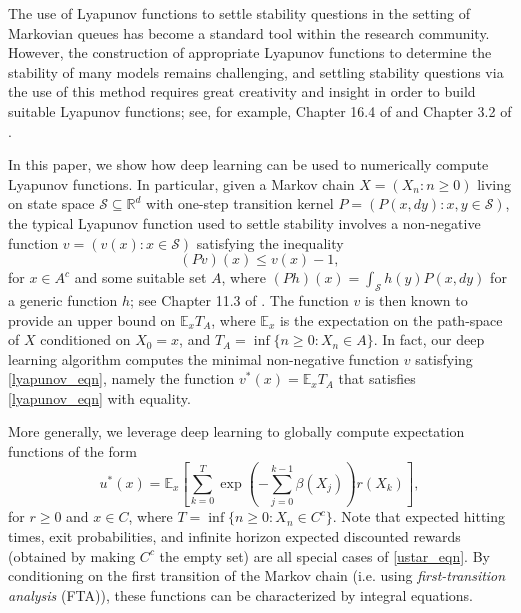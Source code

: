 \documentclass[pdflatex,sn-mathphys-ay]{sn-jnl}%
\numberwithin{equation}{section}
\newcommand\prs[1]{\left(#1\right)}
\newcommand\sbk[1]{\left[#1\right]}
\newcommand{\E}{\mathbb{E}}
\newcommand{\Scal}{\mathcal{S}}
\newcommand{\R}{\mathbb{R}}
\theoremstyle{thmstyleone}%
\theoremstyle{thmstyletwo}%
\theoremstyle{thmstylethree}%
\begin{document}
The use of Lyapunov functions to settle stability questions in the setting of Markovian queues has become a standard tool within the research community. However, the construction of appropriate Lyapunov functions to determine the stability of many models remains challenging, and settling stability questions via the use of this method requires great creativity and insight in order to build suitable Lyapunov functions; see, for example, Chapter 16.4 of \cite{meyn2012markov} and Chapter 3.2 of \cite{dai2020processing}.

In this paper, we show how deep learning can be used to numerically compute Lyapunov functions. In particular, given a Markov chain $X=(X_n:n\geq0)$ living on state space $\Scal\subseteq \R^d$ with one-step transition kernel $P=(P(x,dy):x,y\in\Scal)$, the typical Lyapunov function used to settle stability involves a non-negative function $v=(v(x):x\in\Scal)$ satisfying the inequality
\begin{equation}
\label{lyapunov_eqn}
(Pv)(x)\leq v(x)-1,
\end{equation}
for $x\in A^c$ and some suitable set $A$, where $(Ph)(x)=\int_\Scal h(y)P(x,dy)$ for a generic function $h$; see Chapter 11.3 of \cite{meyn2012markov}. The function $v$ is then known to provide an upper bound on $\E_x T_A$, where $\E_x$ is the expectation on the path-space of $X$ conditioned on $X_0=x$, and $T_A=\inf\{n\geq0:X_n\in A\}$. In fact, our deep learning algorithm computes the minimal non-negative function $v$ satisfying \eqref{lyapunov_eqn}, namely the function $v^*(x)=\E_x T_A$ that satisfies \eqref{lyapunov_eqn} with equality.

More generally, we leverage deep learning to globally compute expectation functions of the form 
\begin{equation} 
\label{ustar_eqn}
u^*(x)=\E_x\sbk{\sum_{k=0}^T\exp\prs{-\sum_{j=0}^{k-1}\beta(X_j)}r(X_k)},
\end{equation}
for $r\geq0$ and $x\in C$, where $T=\inf\{n\geq0:X_n\in C^c\}$. Note that expected hitting times, exit probabilities, and infinite horizon expected discounted rewards (obtained by making $C^c$ the empty set) are all special cases of \eqref{ustar_eqn}. 
By conditioning on the first transition of the Markov chain (i.e. using {\it first-transition analysis} (FTA)), these functions can be characterized by integral equations.

\end{document}
